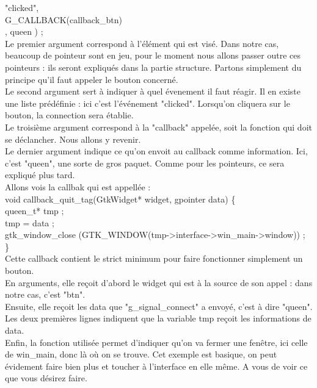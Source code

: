 \documentclass[11pt,french,a4paper]{report}
\begin{document}
                   "clicked", \\
                    G\_CALLBACK(callback\_btn) \\,
                    queen ) ; \\
Le premier argument correspond à l'élément qui est visé. Dans notre cas, beaucoup de pointeur sont en jeu,
pour le moment nous allons passer outre ces pointeurs : ils seront expliqués dans la partie structure. 
Partons simplement du principe qu'il faut appeler le bouton concerné.  \\
Le second argument sert à indiquer à quel évenement il faut réagir. Il en existe une liste prédéfinie : ici
c'est l'événement "clicked". Lorsqu'on cliquera sur le bouton, la connection sera établie. \\
Le troisième argument correspond à la "callback" appelée, soit la fonction qui doit se déclancher. Nous allons 
y revenir. \\
Le dernier argument indique ce qu'on envoit au callback comme information. Ici, c'est "queen", une sorte de 
gros paquet. Comme pour les pointeurs, ce sera expliqué plus tard. \\

Allons vois la callbak qui est appellée : \\
void callback\_quit\_tag(GtkWidget* widget, gpointer data) \{ \\                                      
    queen\_t* tmp ; \\                                                                             
    tmp = data ; \\                                                                               
    gtk\_window\_close (GTK\_WINDOW(tmp->interface->win\_main->window)) ; \\
\} \\

Cette callback contient le strict minimum pour faire fonctionner simplement un bouton.\\
En arguments, elle reçoit d'abord le widget qui est à la source de son appel : dans notre cas, c'est "btn". \\
Ensuite, elle reçoit les data que "g\_signal\_connect" a envoyé, c'est à dire "queen". \\
Les deux premières lignes indiquent que la variable tmp reçoit les informations de data. \\
Enfin, la fonction utilisée permet d'indiquer qu'on va fermer une fenêtre, ici celle de win\_main, donc là où on
se trouve. Cet exemple est basique, on peut évidement faire bien plus et toucher à l'interface en elle même. A 
vous de voir ce que vous désirez faire. \\
\end{document}
